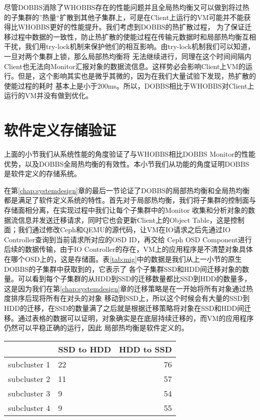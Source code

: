 尽管DOBBS消除了WHOBBS存在的性能问题并且全局热均衡又可以做到将过热的子集群的”热量“扩散到其他子集群上，可是在Client上运行的VM可能并不能获得比WHOBBS更好的性能提升。我们考虑到DOBBS的热扩散过程，
为了保证迁移过程中数据的一致性，防止热扩散的使能过程在传输元数据时和局部热均衡互相干扰，我们用try-lock机制来保护他们的相互影响。由try-lock机制我们可以知道，一旦对两个集群上锁，那么局部热均衡将
无法继续进行，同理在这个时间间隔内Client也无法向Monitor汇报对象的数据流信息。这样势必会影响Client上VM的运行。但是，这个影响其实也是微乎其微的，因为在我们大量试验下发现，热扩散的使能过程的耗时
基本上是小于200ms。所以，DOBBS相比于WHOBBS对Client上运行的VM并没有做到优化。

\section{软件定义存储验证}
上面的小节我们从系统性能的角度验证了与WHOBBS相比DOBBS Monitor的性能优势，以及DOBBS全局热均衡的有效性。本小节我们从功能的角度证明DOBBS是软件定义的存储系统。

在第\ref{chap:systemdesign}章的最后一节论证了DOBBS的局部热均衡和全局热均衡都是满足了软件定义系统的特性。首先对于局部热均衡，我们将子集群的控制面与存储面相分离，在实现过程中我们让每个子集群中的Monitor
收集和分析对象的数据流信息并发送迁移请求，同时它也会更新Client上的Object Table，这是控制面；我们通过修改Ceph和QEMU的源代码，让VM在IO请求之后先通过IO Controller查询到当前请求所对应的OSD ID，再交给
Ceph OSD Component进行后续的数据传输，由于IO Controller的存在，VM上的应用程序是不清楚对象具体在哪个OSD上的，这是存储面。表\ref{tab:mig}中的数据是我们从上一小节的原生DOBBS的子集群中获取到的，它表示了
各个子集群SSD和HDD间迁移对象的数量。可以看到每个子集群的从HDD到SSD的迁移数量都比SSD到HDD的数量多，这是因为我们在第\ref{chap:systemdesign}章的迁移策略是在一开始将所有对象通过热度排序后现将所有在对头的对象
移动到SSD上，所以这个时候会有大量的SSD到HDD的迁移，在SSD的数量满了之后就是根据迁移策略将对象在SSD和HDD间迁移。通过表格的数据可以证明，对象确实是在底层持续迁移的，而VM的应用程序仍然可以平稳正确的运行，因此
局部热均衡是软件定义的。

\begin{table}[!hpb]
    \centering
    \begin{tabular}{@{}llr@{}} \toprule
      & SSD to HDD & HDD to SSD\\ \midrule
      subcluster 1 & 22 & 76 \\
      subcluster 2 & 11 & 57 \\
      subcluster 3 & 9 & 54 \\
      subcluster 4 & 9 & 55 \\
    \end{tabular}
\end{table}


